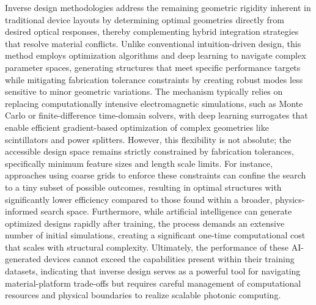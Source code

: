 Inverse design methodologies address the remaining geometric rigidity inherent in traditional device layouts by determining optimal geometries directly from desired optical responses, thereby complementing hybrid integration strategies that resolve material conflicts. \citep{doi_10_1364_oe_524318_cf5f0d79} \citep{doi_10_1364_ol_453299_4bc70b17} Unlike conventional intuition-driven design, this method employs optimization algorithms and deep learning to navigate complex parameter spaces, generating structures that meet specific performance targets while mitigating fabrication tolerance constraints by creating robust modes less sensitive to minor geometric variations. The mechanism typically relies on replacing computationally intensive electromagnetic simulations, such as Monte Carlo or finite-difference time-domain solvers, with deep learning surrogates that enable efficient gradient-based optimization of complex geometries like scintillators and power splitters. \citep{doi_10_1109_jmmct_2026_3695747_9d633c4d} \citep{doi_10_17725_j_rensit_2026_18_163_741010b8} However, this flexibility is not absolute; the accessible design space remains strictly constrained by fabrication tolerances, specifically minimum feature sizes and length scale limits. For instance, approaches using coarse grids to enforce these constraints can confine the search to a tiny subset of possible outcomes, resulting in optimal structures with significantly lower efficiency compared to those found within a broader, physics-informed search space. Furthermore, while artificial intelligence can generate optimized designs rapidly after training, the process demands an extensive number of initial simulations, creating a significant one-time computational cost that scales with structural complexity. Ultimately, the performance of these AI-generated devices cannot exceed the capabilities present within their training datasets, indicating that inverse design serves as a powerful tool for navigating material-platform trade-offs but requires careful management of computational resources and physical boundaries to realize scalable photonic computing. \citep{doi_10_1515_nanoph_2024_0536_4b6631ba} \citep{doi_10_1515_nanoph_2023_0852_cb27a26f} \citep{doi_10_1109_cleo_europe_eqec65582_2025_11110329_26a41a7d}

